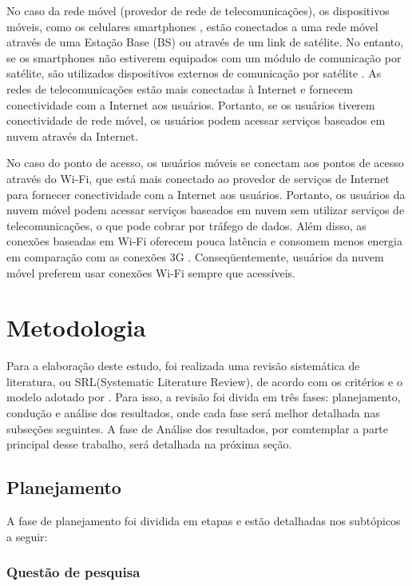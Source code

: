 \documentclass[12pt]{article}
\begin{document}
No caso da rede móvel (provedor de rede de telecomunicações), os dispositivos móveis, como os celulares smartphones \cite{satelite},
estão conectados a uma rede móvel através de uma Estação Base (BS) ou através de um link de satélite. No entanto, 
se os smartphones não estiverem equipados com um módulo de comunicação por satélite, são utilizados dispositivos 
externos de comunicação por satélite \cite{spot}. As redes de telecomunicações estão mais conectadas à Internet e 
fornecem conectividade com a Internet aos usuários. Portanto, se os usuários tiverem conectividade de rede móvel, 
os usuários podem acessar serviços baseados em nuvem através da Internet.

No caso do ponto de acesso, os usuários móveis se conectam aos pontos de acesso através do Wi-Fi, que está mais conectado 
ao provedor de serviços de Internet para fornecer conectividade com a Internet aos usuários. Portanto, os usuários da nuvem móvel
podem acessar serviços baseados em nuvem sem utilizar serviços de telecomunicações, o que pode cobrar por tráfego de dados. 
Além disso, as conexões baseadas em Wi-Fi oferecem pouca latência e consomem menos energia em comparação com as conexões 3G \cite{cuervo2010}.
Conseqüentemente, usuários da nuvem móvel preferem usar conexões Wi-Fi sempre que acessíveis.

\section{Metodologia}

Para a elaboração deste estudo, foi realizada uma revisão sistemática de literatura,
ou SRL(Systematic Literature Review), de acordo com os critérios e o modelo adotado 
por \cite{kitchenham2012}. Para isso, a revisão foi divida em três fases: planejamento,
condução e análise dos resultados, onde cada fase será melhor detalhada nas subseções seguintes.
A fase de Análise dos resultados, por comtemplar a parte principal desse trabalho, será detalhada
na próxima seção.

\subsection{Planejamento}

A fase de planejamento foi dividida em etapas e estão detalhadas nos subtópicos a seguir:

\subsubsection{Questão de pesquisa}
\end{document}
